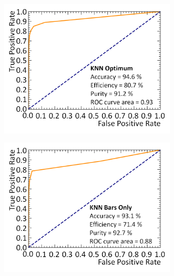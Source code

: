 \begin{figure}[!h]
\centering
\begin{subfigure}{.4\textwidth}
  \centering
  \includegraphics[width=\linewidth]{Chapter4.5/Figs/knnOptimumRoc.png}
  \captionsetup{width=.9\linewidth}
  \caption{}
  \label{subFig:knnOptimumRoc}
\end{subfigure}%
\qquad
\begin{subfigure}{.4\textwidth}
  \centering
  \includegraphics[width=\linewidth]{Chapter4.5/Figs/knnBarsOnlyRoc.png}
  \captionsetup{width=.9\linewidth}
  \caption{}
  \label{subFig:knnBarsOnlyRoc}
\end{subfigure}
\begin{subfigure}{.4\textwidth}

\end{subfigure}
\end{figure}
